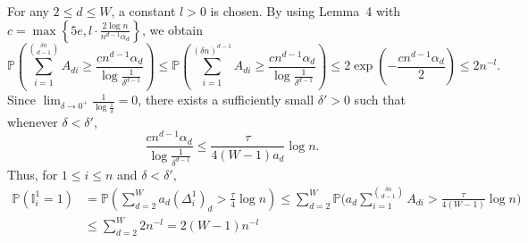 \documentclass{article}
\begin{document}
For any $2 \le d \le W$, a constant $l>0$ is chosen. By using Lemma~4 with $c=\max \left\{ 5e, l \cdot \frac{2 \log n}{n^{d-1} \alpha_d} \right\}$, we obtain
\begin{equation}\label{s66}
	\mathbb{P}\left( \sum_{i=1}^{\binom{\delta n}{d-1}} A_{di} \geq \frac{cn^{d-1}\alpha_d}{\log \frac{1}{\delta^{d-1}}} \right) \leq \mathbb{P}\left(  \sum_{i=1}^{(\delta n)^{d-1}} A_{di} \geq \frac{cn^{d-1}\alpha_d}{\log \frac{1}{\delta^{d-1}}}  \right) \leq  2\exp \left( -\frac{cn^{d-1}\alpha_d}{2} \right) \leq 2n^{-l}.
\end{equation}
Since $\lim_{\delta \rightarrow 0^+} \frac{1}{\log \frac{1}{\delta}} = 0$, there exists a sufficiently small $\delta' > 0$ such that whenever $\delta < \delta'$,
\begin{equation}\label{s67}
	\frac{cn^{d-1}\alpha_d}{\log \frac{1}{\delta^{d-1}}} \leq \frac{\tau}{4  (W-1) a_d } \log n.
\end{equation}
Thus, for $1 \leq i\leq n$ and $\delta < \delta'$,
\begin{equation}\label{s69}
    \begin{aligned}
        \mathbb{P}\left( \mathbb{I}^{1}_i = 1 \right) &= \mathbb{P}\left(  \sum_{d=2}^{W} a_d (\Delta_i^1)_d > \frac{\tau}{4 } \log n  \right) \leq \sum_{d=2}^W \mathbb{P} \Bigg( a_d\sum_{i=1}^{\binom{\delta n}{d-1}} A_{di} > \frac{\tau}{4 (W-1)  } \log n  \Bigg) \\
        & \leq \sum_{d=2}^W 2n^{-l} = 2(W-1)n^{-l}
    \end{aligned}
\end{equation}
\end{document}
